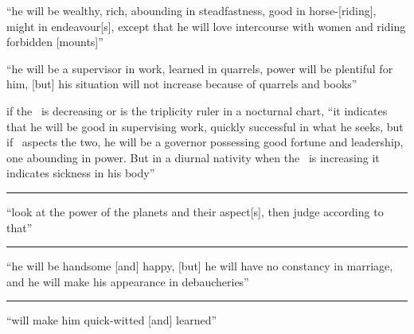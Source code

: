 \begin{description}[style=multiline,leftmargin=2.5cm]
\item[\Mars\Trine\Venus] ``he will be wealthy, rich, abounding in steadfastness, good in horse-[riding], might in endeavour[s], except that he will love intercourse with women and riding forbidden [mounts]''

\item[\Mars\Trine\Mercury] ``he will be a supervisor in work, learned in quarrels, power will be plentiful for him, [but] his situation will not increase because of quarrels and books''

\item[\Mars\Trine\Moon] if the \Moon\, is decreasing or is the triplicity ruler in a nocturnal chart, ``it indicates that he will be good in supervising work, quickly successful in what he seeks, but if \Jupiter\, aspects the two, he will be a governor possessing good fortune and leadership, one abounding in power. But in a diurnal nativity when the \Moon\, is increasing it indicates sickness in his body''

\vspace{0.5em}\hrule

\item[\Sun\Trine\Moon] ``look at the power of the planets and their aspect[s], then judge according to that''

\vspace{0.5em}\hrule
\item[\Venus\Trine\Moon] ``he will be handsome [and] happy, [but] he will have no constancy in marriage, and he will make his appearance in debaucheries''

\vspace{0.5em}\hrule
\item[\Mercury\Trine\Moon] ``will make him quick-witted [and] learned''
\end{description}